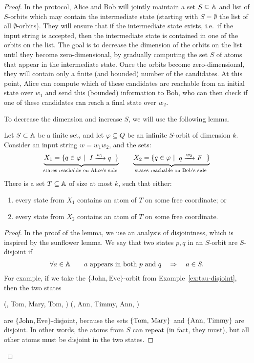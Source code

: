 \begin{proof}
In the protocol, Alice and Bob will jointly maintain a set $S \subseteq \mathbb A$ and list of $S$-orbits which may contain the intermediate state (starting with $S = \emptyset$ the list of all $\emptyset$-orbits). They will ensure that if the intermediate state exists, i.e.~if the input string is accepted,  then the intermediate state is contained in one of the orbits on the list.
The goal is to decrease the dimension of the orbits on the list until they become zero-dimensional, by gradually computing the set $S$ of atoms that appear in the intermediate state. Once the orbits become zero-dimensional, they will contain only a finite (and bounded) number of the candidates. At this point, Alice can compute which of these candidates are reachable from an initial state over $w_1$ and send this (bounded) information to Bob, who can then check if one of these candidates can reach a final state over $w_2$. 

To decrease the dimension and increase $S$, we will use the following lemma.
\begin{lemma}\label{lem:fixed-atoms}
        Let $S \subset \mathbb A$ be a finite set, and let $\varphi \subseteq Q$ be an infinite $S$-orbit 
        of dimension $k$. 
        Consider an input string $w = w_1 w_2$, and the sets:
        \begin{align*}
        \myunderbrace{X_1 = \setbuild{ q \in \varphi}{$ I \xrightarrow{w_1} q$}}{states reachable on Alice's side}
        \qquad
        \myunderbrace{X_2 = \setbuild{ q \in \varphi}{$ q \xrightarrow{w_2} F$}}{states reachable on Bob's side}
        \end{align*}
        There is a set $T \subseteq \mathbb A$ of size at most $k$, such that either: 
\begin{enumerate}
    \item   every state from $X_1$ contains an atom of $T$ on some free coordinate; or 
    \item   every state from $X_2$ contains an atom of $T$ on some free coordinate.
\end{enumerate}
    \end{lemma}
    \begin{proof}
 In the proof of the lemma, we use an analysis of disjointness, which is inspired by the sunflower lemma.
 We say that two states $p,q$ in an  $S$-orbit are $S$-disjoint if 
 \begin{align*}
    \forall a \in \mathbb A 
    \qquad 
 \text{$a$ appears in both $p$ and $q$} \quad \Rightarrow \quad a \in S.
 \end{align*}
 For example, if we take the $\{\textrm{John}, \textrm{Eve}\}$-orbit from Example~\ref{ex:tau-disjoint}, then the two states
\begin{center}
    (, Tom, Mary, Tom, ) \qquad
    (, Ann, Timmy, Ann, )
\end{center}
are $\{\textrm{John}, \textrm{Eve}\}$-disjoint, because the sets $\{\text{Tom, Mary}\}$ and $\{\text{Ann, Timmy}\}$ are disjoint. In other words, the atoms from $S$ can repeat (in fact, they must),
but all other atoms must be disjoint in the two states.


\end{proof}
\end{proof}
